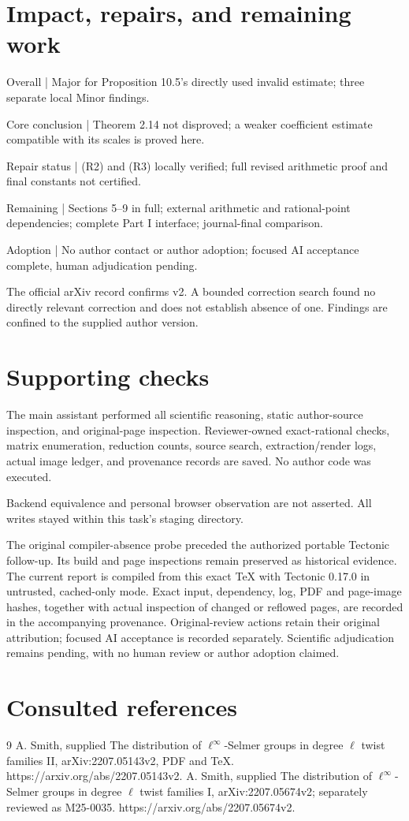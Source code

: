 \documentclass[10pt]{article}
\begin{document}
\section*{Impact, repairs, and remaining work}
Overall | Major for Proposition 10.5’s directly used invalid estimate; three separate local Minor findings.\par
Core conclusion | Theorem 2.14 not disproved; a weaker coefficient estimate compatible with its scales is proved here.\par
Repair status | (R2) and (R3) locally verified; full revised arithmetic proof and final constants not certified.\par
Remaining | Sections 5–9 in full; external arithmetic and rational-point dependencies; complete Part I interface; journal-final comparison.\par
Adoption | No author contact or author adoption; focused AI acceptance complete, human adjudication pending.\par
The official arXiv record confirms v2. A bounded correction search found no directly relevant correction and does not establish absence of one. Findings are confined to the supplied author version.\par
\section*{Supporting checks}
The main assistant performed all scientific reasoning, static author-source inspection, and original-page inspection. Reviewer-owned exact-rational checks, matrix enumeration, reduction counts, source search, extraction/render logs, actual image ledger, and provenance records are saved. No author code was executed.\par
Backend equivalence and personal browser observation are not asserted. All writes stayed within this task’s staging directory.\par
The original compiler-absence probe preceded the authorized portable Tectonic follow-up. Its build and page inspections remain preserved as historical evidence. The current report is compiled from this exact TeX with Tectonic 0.17.0 in untrusted, cached-only mode. Exact input, dependency, log, PDF and page-image hashes, together with actual inspection of changed or reflowed pages, are recorded in the accompanying provenance. Original-review actions retain their original attribution; focused AI acceptance is recorded separately. Scientific adjudication remains pending, with no human review or author adoption claimed.\par
\section*{Consulted references}
9 A. Smith, supplied The distribution of \(\ell^\infty\)-Selmer groups in degree \(\ell\) twist families II, arXiv:2207.05143v2, PDF and TeX. https://arxiv.org/abs/2207.05143v2. A. Smith, supplied The distribution of \(\ell^\infty\)-Selmer groups in degree \(\ell\) twist families I, arXiv:2207.05674v2; separately reviewed as M25-0035. https://arxiv.org/abs/2207.05674v2.\par
\end{document}
